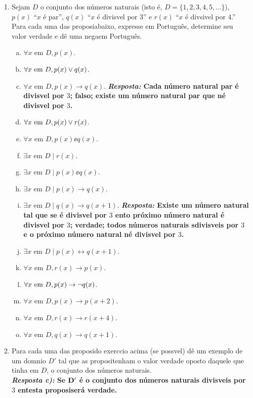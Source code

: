 \begin{enumerate}[{\bf 1.}]
\item Sejam $D$ o conjunto dos n\'umeros naturais (isto \'e, $D=\{1,2,3,4,5,\ldots\}$), $p(x)$ ``$x$ \'e par'', $q(x)$ ``$x$ \'e divis\ih vel por $3$'' e $r(x)$ ``$x$ \'e div\ih sivel por $4$.'' Para cada uma das proposi\coes abaixo, expresse em Portugu\^es, determine seu valor verdade e d\^e uma nega\cao em Portugu\^es.  
\begin{enumerate}[a)]
\item $\forall x \textrm{ em } D, p(x)$.
\item $\forall x \textrm{ em } D, p(x)\vee q(x)$.
\item $\forall x \textrm{ em } D, p(x)\to q(x)$. {\bf{\it Resposta:} Cada n\'umero natural par \'e divis\ih vel por $3$; falso; existe um n\'umero natural par que n\ao \'e divis\ih vel por $3$.}
\item $\forall x \textrm{ em } D, p(x)\vee r(x)$.
\item $\forall x \textrm{ em } D, p(x)\ee q(x)$.
\item $\exists x \textrm{ em } D \mid  r(x)$.
\item $\exists x \textrm{ em } D \mid  p(x)\ee q(x)$.
\item $\exists x \textrm{ em } D \mid  p(x)\to q(x)$.
\item $\exists x \textrm{ em } D \mid  q(x)\to q(x+1)$. {\bf{\it Resposta:} Existe um n\'umero natural tal que se \'e divis\ih vel por $3$ ent\ao o pr\'oximo n\'umero natural \'e divis\ih vel por $3$; verdade; todos n\'umeros naturais s\ao divis\ih veis por $3$ e o pr\'oximo n\'umero natural n\ao \'e divis\ih vel por $3$.}
\item $\exists x \textrm{ em } D \mid  p(x) \leftrightarrow q(x+1)$.
\item $\forall x \textrm{ em } D, r(x)\to p(x)$.
\item $\forall x \textrm{ em } D, p(x)\to\lnot q(x)$.
\item $\forall x \textrm{ em } D, p(x)\to p(x+2)$.
\item $\forall x \textrm{ em } D, r(x)\to r(x+4)$.
\item $\forall x \textrm{ em } D, q(x)\to q(x+1)$.
\end{enumerate}

\item Para cada uma das proposi\coes do exerc\ih cio acima (se poss\ih vel) d\^e um exemplo de um dom\ih nio $D'$ tal que as proposi\coes tenham o valor verdade oposto daquele que tinha em $D$, o conjunto dos n\'umeros naturais.\\
{\bf{\it Resposta c):} Se ${\bf D'}$ \'e o conjunto dos n\'umeros naturais divis\ih veis por $3$ ent\ao esta proposi\cao ser\'a verdade.}\\


\end{enumerate}
